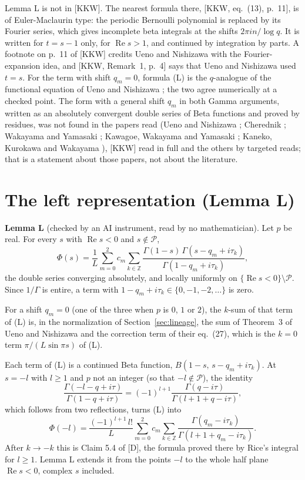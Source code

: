 \documentclass[11pt]{article}
\newcommand{\re}{\operatorname{Re}}
\begin{document}
Lemma L is not in [KKW]. The nearest formula there, [KKW, eq.~(13), p.~11], is of Euler-Maclaurin type: the periodic Bernoulli polynomial is replaced by its Fourier series, which gives incomplete beta integrals at the shifts $2\pi in/\log q$. It is written for $t=s-1$ only, for $\re s>1$, and continued by integration by parts. A footnote on p.~11 of [KKW] credits Ueno and Nishizawa with the Fourier-expansion idea, and [KKW, Remark~1, p.~4] says that Ueno and Nishizawa used $t=s$. For the term with shift $q_m=0$, formula (L) is the $q$-analogue of the functional equation of Ueno and Nishizawa \cite[Theorem~3, eq.~(32) together with eq.~(27), at $z=1$]{UN}; the two agree numerically at a checked point. The form with a general shift $q_m$ in both Gamma arguments, written as an absolutely convergent double series of Beta functions and proved by residues, was not found in the papers read (Ueno and Nishizawa \cite{UN}; Cherednik \cite{Ch}; Wakayama and Yamasaki \cite{WY}; Kawagoe, Wakayama and Yamasaki \cite{KWY}; Kaneko, Kurokawa and Wakayama \cite{KKW}), [KKW] read in full and the others by targeted reads; that is a statement about those papers, not about the literature.

\section{The left representation (Lemma L)}\label{sec:L}

\noindent\textbf{Lemma L} (checked by an AI instrument, read by no mathematician). Let $p$ be real. For every $s$ with $\re s<0$ and $s\notin\mathcal{P}$,
\begin{equation*}
\Phi(s)=\frac1L\sum_{m=0}^{2}c_m\sum_{k\in\mathbb{Z}}\frac{\Gamma(1-s)\,\Gamma(s-q_m+i\tau_k)}{\Gamma(1-q_m+i\tau_k)}, \tag{L}
\end{equation*}
the double series converging absolutely, and locally uniformly on $\{\re s<0\}\setminus\mathcal{P}$. Since $1/\Gamma$ is entire, a term with $1-q_m+i\tau_k\in\{0,-1,-2,\dots\}$ is zero.

\medskip
For a shift $q_m=0$ (one of the three when $p$ is $0$, $1$ or $2$), the $k$-sum of that term of (L) is, in the normalization of Section~\ref{sec:lineage}, the sum of Theorem~3 of Ueno and Nishizawa \cite[eq.~(32), at $z=1$]{UN} and the correction term of their eq.~(27), which is the $k=0$ term $\pi/(L\sin\pi s)$ of (L).

\medskip
Each term of (L) is a continued Beta function, $B(1-s,\,s-q_m+i\tau_k)$. At $s=-l$ with $l\ge1$ and $p$ not an integer (so that $-l\notin\mathcal{P}$), the identity
\[
\frac{\Gamma(-l-q+i\tau)}{\Gamma(1-q+i\tau)}=(-1)^{l+1}\frac{\Gamma(q-i\tau)}{\Gamma(l+1+q-i\tau)},
\]
which follows from two reflections, turns (L) into
\[
\Phi(-l)=\frac{(-1)^{l+1}\,l!}{L}\sum_{m=0}^{2}c_m\sum_{k\in\mathbb{Z}}\frac{\Gamma(q_m-i\tau_k)}{\Gamma(l+1+q_m-i\tau_k)}.
\]
After $k\to-k$ this is Claim 5.4 of [D], the formula proved there by Rice's integral for $l\ge1$. Lemma L extends it from the points $-l$ to the whole half plane $\re s<0$, complex $s$ included.
\end{document}
